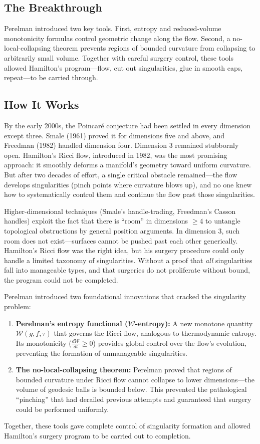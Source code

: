 \subsection{The Breakthrough}
Perelman introduced two key tools. First, entropy and reduced-volume monotonicity formulas control geometric change along the flow. Second, a no-local-collapsing theorem prevents regions of bounded curvature from collapsing to arbitrarily small volume. Together with careful surgery control, these tools allowed Hamilton's program---flow, cut out singularities, glue in smooth caps, repeat---to be carried through.

\subsection{How It Works}

By the early 2000s, the Poincar\'e conjecture had been settled in every dimension except three. Smale (1961) proved it for dimensions five and above, and Freedman (1982) handled dimension four. Dimension 3 remained stubbornly open. Hamilton's Ricci flow, introduced in 1982, was the most promising approach: it smoothly deforms a manifold's geometry toward uniform curvature. But after two decades of effort, a single critical obstacle remained---the flow develops singularities (pinch points where curvature blows up), and no one knew how to systematically control them and continue the flow past those singularities.

Higher-dimensional techniques (Smale's handle-trading, Freedman's Casson handles) exploit the fact that there is ``room'' in dimensions $\geq 4$ to untangle topological obstructions by general position arguments. In dimension 3, such room does not exist---surfaces cannot be pushed past each other generically. Hamilton's Ricci flow was the right idea, but his surgery procedure could only handle a limited taxonomy of singularities. Without a proof that \emph{all} singularities fall into manageable types, and that surgeries do not proliferate without bound, the program could not be completed.

Perelman introduced two foundational innovations that cracked the singularity problem:
\begin{enumerate}
\item \textbf{Perelman's entropy functional ($\mathcal{W}$-entropy):} A new monotone quantity $\mathcal{W}(g,f,\tau)$ that governs the Ricci flow, analogous to thermodynamic entropy. Its monotonicity ($\frac{d\mathcal{W}}{dt}\geq 0$) provides global control over the flow's evolution, preventing the formation of unmanageable singularities.
\item \textbf{The no-local-collapsing theorem:} Perelman proved that regions of bounded curvature under Ricci flow cannot collapse to lower dimensions---the volume of geodesic balls is bounded below. This prevented the pathological ``pinching'' that had derailed previous attempts and guaranteed that surgery could be performed uniformly.
\end{enumerate}
Together, these tools gave complete control of singularity formation and allowed Hamilton's surgery program to be carried out to completion.

